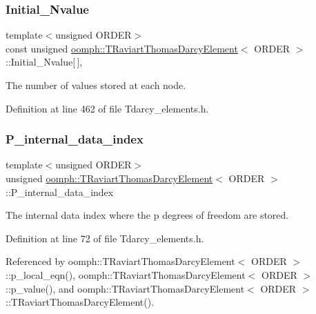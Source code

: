 \subsubsection{\texorpdfstring{Initial\+\_\+\+Nvalue}{Initial\_Nvalue}}
{\footnotesize\ttfamily template$<$unsigned O\+R\+D\+ER$>$ \\
const unsigned \hyperlink{classoomph_1_1TRaviartThomasDarcyElement}{oomph\+::\+T\+Raviart\+Thomas\+Darcy\+Element}$<$ O\+R\+D\+ER $>$\+::Initial\+\_\+\+Nvalue\mbox{[}$\,$\mbox{]}\hspace{0.3cm}{\ttfamily [static]}, {\ttfamily [protected]}}



The number of values stored at each node. 



Definition at line 462 of file Tdarcy\+\_\+elements.\+h.

\mbox{\label{classoomph_1_1TRaviartThomasDarcyElement_ab4d0dfd16c5bbeb12c9420e2d137e1f2}} 
\subsubsection{\texorpdfstring{P\+\_\+internal\+\_\+data\+\_\+index}{P\_internal\_data\_index}}
{\footnotesize\ttfamily template$<$unsigned O\+R\+D\+ER$>$ \\
unsigned \hyperlink{classoomph_1_1TRaviartThomasDarcyElement}{oomph\+::\+T\+Raviart\+Thomas\+Darcy\+Element}$<$ O\+R\+D\+ER $>$\+::P\+\_\+internal\+\_\+data\+\_\+index\hspace{0.3cm}{\ttfamily [private]}}



The internal data index where the p degrees of freedom are stored. 



Definition at line 72 of file Tdarcy\+\_\+elements.\+h.



Referenced by oomph\+::\+T\+Raviart\+Thomas\+Darcy\+Element$<$ O\+R\+D\+E\+R $>$\+::p\+\_\+local\+\_\+eqn(), oomph\+::\+T\+Raviart\+Thomas\+Darcy\+Element$<$ O\+R\+D\+E\+R $>$\+::p\+\_\+value(), and oomph\+::\+T\+Raviart\+Thomas\+Darcy\+Element$<$ O\+R\+D\+E\+R $>$\+::\+T\+Raviart\+Thomas\+Darcy\+Element().

